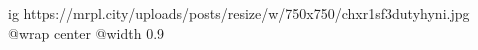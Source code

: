  
 
 
 
 

\ifcmt
  ig https://mrpl.city/uploads/posts/resize/w/750x750/chxr1sf3dutyhyni.jpg
  @wrap center
  @width 0.9
\fi
